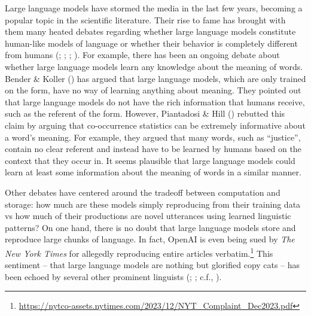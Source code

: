 \documentclass[
  12pt,
  letterpaper,
]{scrreport}
\begin{document}
Large language models have stormed the media in the last few years,
becoming a popular topic in the scientific literature. Their rise to
fame has brought with them many heated debates regarding whether large
language models constitute human-like models of language or whether
their behavior is completely different from humans
(;
;
;
). For example, there has been an ongoing debate about whether
large language models learn any knowledge about the meaning of words.
Bender \& Koller () has
argued that large language models, which are only trained on the form,
have no way of learning anything about meaning. They pointed out that
large language models do not have the rich information that humans
receive, such as the referent of the form. However, Piantadosi \& Hill
() rebutted this
claim by arguing that co-occurrence statistics can be extremely
informative about a word's meaning. For example, they argued that many
words, such as ``justice'', contain no clear referent and instead have
to be learned by humans based on the context that they occur in. It
seems plausible that large language models could learn at least some
information about the meaning of words in a similar manner.

Other debates have centered around the tradeoff between computation and
storage: how much are these models simply reproducing from their
training data vs how much of their productions are novel utterances
using learned linguistic patterns? On one hand, there is no doubt that
large language models store and reproduce large chunks of language. In
fact, OpenAI is even being sued by \emph{The New York Times} for
allegedly reproducing entire articles verbatim.\footnote{\url{https://nytco-assets.nytimes.com/2023/12/NYT_Complaint_Dec2023.pdf}}
This sentiment -- that large language models are nothing but glorified
copy cats -- has been echoed by several other prominent linguists
(;
;
c.f., ).
\end{document}

